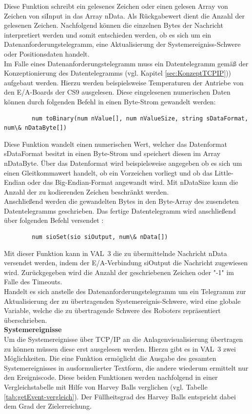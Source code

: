 \documentclass[ a4paper,
                oneside,
                toc=bibliography,
                toc=listof
                ]{scrbook}
\begin{document}
	Diese Funktion schreibt ein gelesenes Zeichen oder einen gelesen Array von Zeichen von siInput in das Array nData. Als Rückgabewert dient die Anzahl der gelesenen Zeichen. Nachfolgend können die einzelnen Bytes der Nachricht interpretiert werden und somit entschieden werden, ob es sich um ein Datenanforderungstelegramm, eine Aktualisierung der Systemereigniss-Schwere oder Positionsdaten handelt. \cite{VAL3} \cite{CS9_TCP}\\
	Im Falle eines Datenanforderungstelegramm muss ein Datentelegramm gemäß der Konzeptionierung des Datentelegramms (vgl. Kapitel \ref{sec:KonzeptTCPIP})) aufgebaut werden. Hierzu werden beispielsweise Temperaturen der Antriebe von den E/A-Boards der CS9 ausgelesen. Diese eingelesenen numerischen Daten können durch folgenden Befehl in einen Byte-Strom gewandelt werden:
	\begin{lstlisting}
		num toBinary(num nValue[], num nValueSize, string sDataFormat, num\& nDataByte[])
	\end{lstlisting}
	Diese Funktion wandelt einen numerischen Wert, welcher das Datenformat sDataFormat besitzt in einen Byte-Strom und speichert diesen im Array nDataByte. Über das Datenformat wird beispielsweise angegeben ob es sich um einen Gleitkommawert handelt, ob ein Vorzeichen vorliegt und ob das Little-Endian oder das Big-Endian-Format angewandt wird. Mit nDataSize kann die Anzahl der zu kodierenden Zeichen beschränkt werden.\\
	Anschließend werden die gewandelten Bytes in den Byte-Array des zusendeten Datentelegramms geschrieben. Das fertige Datentelegramm wird anschließend über folgenden Befehl versendet \cite{VAL3}:
	\begin{lstlisting}
		num sioSet(sio siOutput, num\& nData[])
	\end{lstlisting}
	Mit dieser Funktion kann in VAL~3 die zu übermittelnde Nachricht nData versendet werden, indem der E/A-Verbindung siOutput die Nachricht zugewiesen wird. Zurückgegeben wird die Anzahl der geschriebenen Zeichen oder "-1" im Falle des Timeouts. \\
	Handelt es sich anstelle des Datenanforderungstelegramm um ein Telegramm zur Aktualisierung der zu übertragenden Systemereignis-Schwere, wird eine globale Variable, welche die zu übertragende Schwere des Roboters repräsentiert überschrieben. \cite{VAL3} \cite{CS9_TCP}\\
	\textbf{Systemereignisse}\\
	Um die Systemereignisse über TCP/IP an die Anlagenvisualisierung übertragen zu können müssen diese erst ausgelesen werden. Hierzu gibt es in VAL~3 zwei Möglichkeiten. Die eine Funktion ermöglicht die Ausgabe des gesamten Systemereignisses in ausformulierter Textform, die andere wiederum ermittelt nur den Ereigniscode. \cite{VAL3} Diese beiden Funktionen werden nachfolgend in einer Vergleichstabelle mit Hilfe von Harvey Balls verglichen (vgl. Tabelle \ref{tab:getEvent-vergleich}). Der Füllheitsgrad des Harvey Balls entspricht dabei dem Grad der Zielerreichung.
\end{document}
